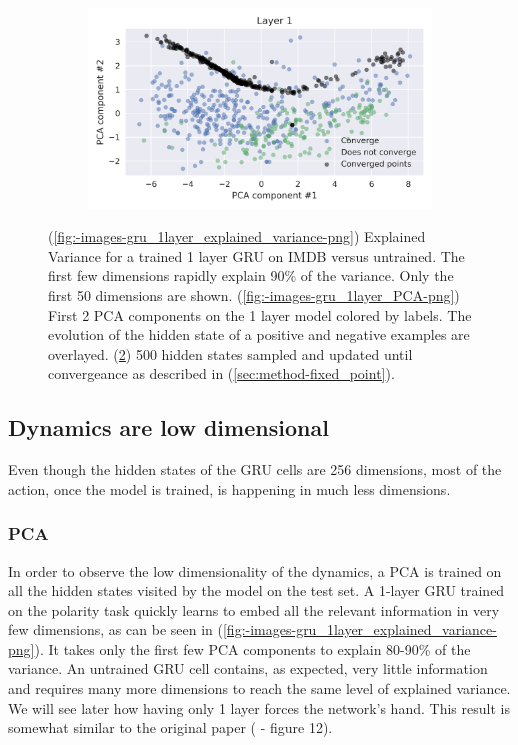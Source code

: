 \documentclass{article}
\begin{document}
\begin{figure}[H]
\begin{subfigure}[b]{0.32\linewidth}
    \includegraphics[width=\textwidth]{../images/gru_1layer_fixed_points.png}
    \caption{}
    \label{fig:-images-gru_1layer_fixed_points-png}
  \end{subfigure}
  \caption{
    (\ref{fig:-images-gru_1layer_explained_variance-png})
    Explained Variance for a trained 1 layer GRU on IMDB versus untrained. 
    The first few dimensions rapidly explain 90\% of the variance. Only the first 50 dimensions are shown.  
    (\ref{fig:-images-gru_1layer_PCA-png})
    First 2 PCA components on the 1 layer model colored by labels. The evolution of the 
    hidden state of a positive and negative examples are overlayed.
    (\ref{fig:-images-gru_1layer_fixed_points-png})
    500 hidden states sampled and updated until convergeance as described in (\ref{sec:method-fixed_point}).
  }
\end{figure}

\subsection{Dynamics are low dimensional}

Even though the hidden states of the GRU cells are 256 dimensions, most of the action, once the model is trained, is happening in much less dimensions.

\subsubsection{PCA}

In order to observe the low dimensionality of the dynamics, a PCA is trained on all the hidden states visited by the model on the test set. A 1-layer GRU trained on the polarity task quickly learns to embed all the relevant information in very few dimensions, as can be seen in (\ref{fig:-images-gru_1layer_explained_variance-png}). It takes only the first few PCA components to explain 80-90\% of the variance. An untrained GRU cell contains, as expected, very little information and requires many more dimensions to reach the same level of explained variance. We will see later how having only 1 layer forces the network's hand. This result is somewhat similar to the original paper (\cite{maheswaranathan2019reverse} - figure 12).
\end{document}
